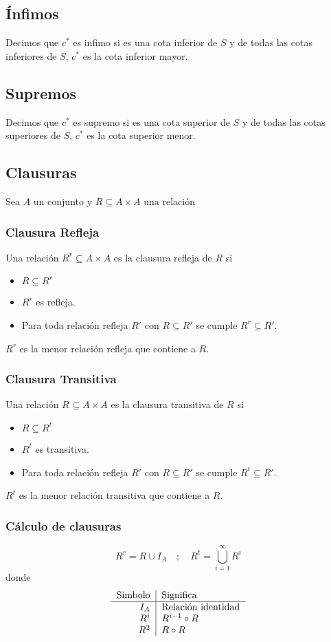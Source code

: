 \documentclass[../main.tex]{subfiles}
\begin{document}
\subsection{Ínfimos}
Decimos que $c^*$ es infimo si es una cota inferior de $S$ y de todas las cotas inferiores de $S$, $c^*$ es la cota inferior mayor.

\subsection{Supremos}
Decimos que $c^*$ es supremo si es una cota superior de $S$ y de todas las cotas superiores de $S$, $c^*$ es la cota superior menor.

\subsection{Clausuras}
Sea $A$ un conjunto y $R \subseteq A \times A$ una relación
\subsubsection{Clausura Refleja}
Una relación $R^{r} \subseteq A \times A$ es la clausura refleja de $R$ si
\begin{itemize}
    \item $R \subseteq R^{r}$
    \item $R^{r}$ es refleja.
    \item Para toda relación refleja $R'$ con $R \subseteq R'$ se cumple $R^{r} \subseteq R'$.
\end{itemize}
$R^{r}$ es la menor relación refleja que contiene a $R$.

\subsubsection{Clausura Transitiva}
Una relación $R^{} \subseteq A \times A$ es la clausura transitiva de $R$ si
\begin{itemize}
    \item $R \subseteq R^{t}$
    \item $R^{t}$ es transitiva.
    \item Para toda relación refleja $R'$ con $R \subseteq R'$ se cumple $R^{t} \subseteq R'$.
\end{itemize}
$R^{t}$ es la menor relación transitiva que contiene a $R$.
\subsubsection{Cálculo de clausuras}
\[ R^{r} = R \cup I_{A} \quad ; \quad R^{t} = \bigcup_{i = 1}^{\infty} R^{i} \]
donde
\[
    \begin{tabular}{r|l}
        Símbolo & Significa\\ \hline
        $I_{A}$ & Relación identidad\\
        $R^{i}$ & $R^{i-1} \circ R$\\
        $R^{2}$ & $R \circ R$
    \end{tabular}
\]
\end{document}
